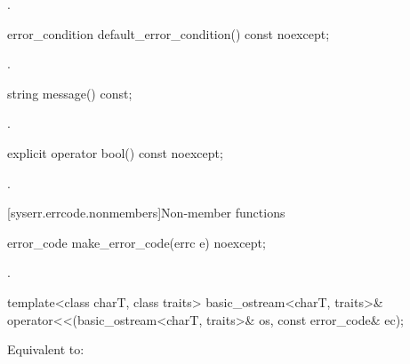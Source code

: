 \begin{itemdescr}
\pnum
\returns
{}.
\end{itemdescr}

%
\begin{itemdecl}
error_condition default_error_condition() const noexcept;
\end{itemdecl}

\begin{itemdescr}
\pnum
\returns
{}.
\end{itemdescr}

%
\begin{itemdecl}
string message() const;
\end{itemdecl}

\begin{itemdescr}
\pnum
\returns
{}.
\end{itemdescr}

%
\begin{itemdecl}
explicit operator bool() const noexcept;
\end{itemdecl}

\begin{itemdescr}
\pnum
\returns
{}.
\end{itemdescr}

[syserr.errcode.nonmembers]{Non-member functions}

%
\begin{itemdecl}
error_code make_error_code(errc e) noexcept;
\end{itemdecl}

\begin{itemdescr}
\pnum
\returns
{}.
\end{itemdescr}

%
\begin{itemdecl}
template<class charT, class traits>
  basic_ostream<charT, traits>& operator<<(basic_ostream<charT, traits>& os, const error_code& ec);
\end{itemdecl}

\begin{itemdescr}
\pnum
\effects
Equivalent to: 
\end{itemdescr}


